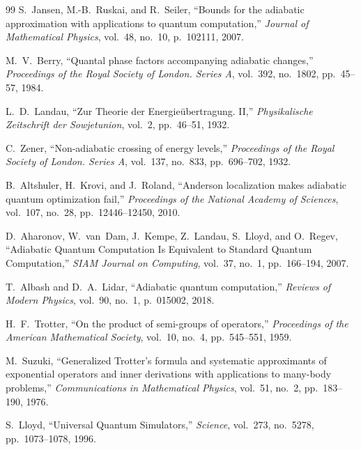 \documentclass[11pt,a4paper,oneside,openany]{ltjsbook}
\theoremstyle{definition}
\theoremstyle{plain}
\theoremstyle{remark}
\begin{document}
\begin{thebibliography}{99}
S.~Jansen, M.-B.~Ruskai, and R.~Seiler,
\newblock ``Bounds for the adiabatic approximation with applications to quantum computation,''
\newblock \textit{Journal of Mathematical Physics}, vol.~48, no.~10, p.~102111, 2007.

M.~V.~Berry,
\newblock ``Quantal phase factors accompanying adiabatic changes,''
\newblock \textit{Proceedings of the Royal Society of London. Series A}, vol.~392, no.~1802, pp.~45--57, 1984.

L.~D.~Landau,
\newblock ``Zur Theorie der Energie{\"u}bertragung. II,''
\newblock \textit{Physikalische Zeitschrift der Sowjetunion}, vol.~2, pp.~46--51, 1932.

C.~Zener,
\newblock ``Non-adiabatic crossing of energy levels,''
\newblock \textit{Proceedings of the Royal Society of London. Series A}, vol.~137, no.~833, pp.~696--702, 1932.

B.~Altshuler, H.~Krovi, and J.~Roland,
\newblock ``Anderson localization makes adiabatic quantum optimization fail,''
\newblock \textit{Proceedings of the National Academy of Sciences}, vol.~107, no.~28, pp.~12446--12450, 2010.

D.~Aharonov, W.~van~Dam, J.~Kempe, Z.~Landau, S.~Lloyd, and O.~Regev,
\newblock ``Adiabatic Quantum Computation Is Equivalent to Standard Quantum Computation,''
\newblock \textit{SIAM Journal on Computing}, vol.~37, no.~1, pp.~166--194, 2007.

T.~Albash and D.~A.~Lidar,
\newblock ``Adiabatic quantum computation,''
\newblock \textit{Reviews of Modern Physics}, vol.~90, no.~1, p.~015002, 2018.

H.~F.~Trotter,
\newblock ``On the product of semi-groups of operators,''
\newblock \textit{Proceedings of the American Mathematical Society}, vol.~10, no.~4, pp.~545--551, 1959.

M.~Suzuki,
\newblock ``Generalized Trotter's formula and systematic approximants of exponential operators and inner derivations with applications to many-body problems,''
\newblock \textit{Communications in Mathematical Physics}, vol.~51, no.~2, pp.~183--190, 1976.

S.~Lloyd,
\newblock ``Universal Quantum Simulators,''
\newblock \textit{Science}, vol.~273, no.~5278, pp.~1073--1078, 1996.


\end{thebibliography}
\end{document}
